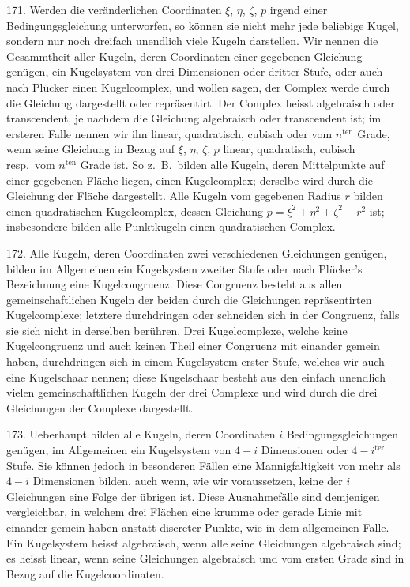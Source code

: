 171. Werden die ver\"anderlichen Coordinaten $\xi$, $\eta$, $\zeta$, $p$
irgend einer Bedingungsgleichung unterworfen, so k\"onnen sie
nicht mehr jede beliebige Kugel, sondern nur noch dreifach
unendlich viele Kugeln darstellen. Wir nennen die Gesammtheit
aller Kugeln, deren Coordinaten einer gegebenen Gleichung
gen\"ugen, ein Kugelsystem von drei Dimensionen oder
dritter Stufe, oder auch nach Pl\"ucker einen {\glqq}Kugelcomplex{\grqq},
und wollen sagen, der Complex werde durch die Gleichung
{\glqq}dargestellt{\grqq} oder {\glqq}repr\"asentirt{\grqq}. Der Complex heisst algebraisch
oder transcendent, je nachdem die Gleichung algebraisch
oder transcendent ist; im ersteren Falle nennen wir
ihn linear, quadratisch, cubisch oder vom $n^{\text{ten}}$ Grade, wenn
seine Gleichung in Bezug auf $\xi$, $\eta$, $\zeta$, $p$ linear, quadratisch,
cubisch resp.\ vom $n^{\text{ten}}$ Grade ist. So z.~B.\ bilden alle Kugeln, deren Mittelpunkte auf einer gegebenen Fl\"ache liegen,
einen Kugelcomplex; derselbe wird durch die Gleichung
der Fl\"ache dargestellt. Alle Kugeln vom gegebenen Radius
$r$ bilden einen quadratischen Kugelcomplex, dessen Gleichung
$p = \xi^2 + \eta^2 + \zeta^2 - r^2$ ist; insbesondere bilden alle
Punktkugeln einen quadratischen Complex.

172. Alle Kugeln, deren Coordinaten zwei verschiedenen
Gleichungen gen\"ugen, bilden im Allgemeinen ein Kugelsystem
zweiter Stufe oder nach Pl\"ucker's Bezeichnung eine {\glqq}Kugelcongruenz{\grqq}.
Diese Congruenz besteht aus allen gemeinschaftlichen
Kugeln der beiden durch die Gleichungen repr\"a\-sen\-tirten
Kugelcomplexe; letztere durchdringen oder {\glqq}schneiden{\grqq}
sich in der Congruenz, falls sie sich nicht in derselben {\glqq}ber\"uhren{\grqq}.
Drei Kugelcomplexe, welche keine Kugelcongruenz
und auch keinen Theil einer Congruenz mit einander gemein
haben, durchdringen sich in einem Kugelsystem erster Stufe,
welches wir auch eine {\glqq}Kugelschaar{\grqq} nennen; diese Kugelschaar
besteht aus den einfach unendlich vielen gemeinschaftlichen
Kugeln der drei Complexe und wird durch die drei
Gleichungen der Complexe dargestellt.


173. Ueberhaupt bilden alle Kugeln, deren Coordinaten $i$
Bedingungsgleichungen gen\"ugen, im Allgemeinen ein Kugelsystem
von $4-i$ Dimensio\-nen oder $4-i^{\text{ter}}$ Stufe. Sie
k\"onnen jedoch in besonderen F\"allen eine Mannigfaltigkeit
von mehr als $4-i$ Dimensionen bilden, auch wenn, wie
wir voraussetzen, keine der $i$ Gleichungen eine Folge der
\"ubrigen ist. Diese Ausnahmef\"alle sind demjenigen vergleichbar,
in welchem drei Fl\"achen eine krumme oder gerade
Linie mit einander gemein haben anstatt discreter Punkte,
wie in dem allgemeinen Falle. Ein Kugelsystem heisst
algebraisch, wenn alle seine Gleichungen algebraisch sind;
es heisst linear, wenn seine Gleichungen algebraisch und vom
ersten Grade sind in Bezug auf die Kugelcoordinaten.

